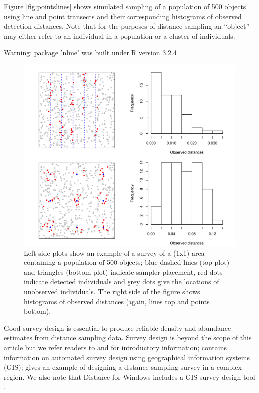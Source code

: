 \documentclass[article]{jss}
\begin{document}
Figure \ref{fig:pointslines} shows simulated sampling of a population of
500 objects using line and point transects and their corresponding
histograms of observed detection distances. Note that for the purposes
of distance sampling an ``object'' may either refer to an individual in
a population or a cluster of individuals.

\begin{CodeChunk}
\begin{CodeOutput}
Warning: package 'nlme' was built under R version 3.2.4
\end{CodeOutput}
\begin{figure}

{\centering \includegraphics{paper_files/figure-latex/points-and-lines-1} 

}

\caption{Left side plots show an example of a survey of a (1x1) area containing a population of 500 objects; blue dashed lines (top plot) and triangles (bottom plot) indicate sampler placement, red dots indicate detected individuals and grey dots give the locations of unobserved individuals. The right side of the figure shows histograms of observed distances (again, lines top and points bottom).\label{fig:pointslines}}\label{fig:points-and-lines}
\end{figure}
\end{CodeChunk}

Good survey design is essential to produce reliable density and
abundance estimates from distance sampling data. Survey design is beyond
the scope of this article but we refer readers to \citet[Chapter
7]{Buckland:2001vm} and \citet[Chapter 2]{buckland2015distance} for
introductory information; \citet{Strindberg:2004vr} contains information
on automated survey design using geographical information systems (GIS);
\citet{Thomas:2007wz} gives an example of designing a distance sampling
survey in a complex region. We also note that Distance for Windows
includes a GIS survey design tool \citep{Thomas:2010cf}.
\end{document}
